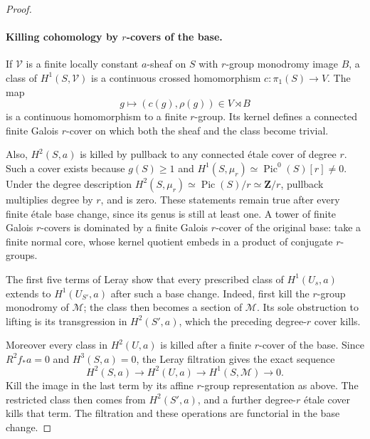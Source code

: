 \begin{proof}
\paragraph{Killing cohomology by $r$-covers of the base.}
If $\mathcal V$ is a finite locally constant $a$-sheaf on $S$ with
$r$-group monodromy image $B$, a class of $H^1(S,\mathcal V)$ is a
continuous crossed homomorphism $c:\pi_1(S)\to V$. The map
\[
 g\longmapsto(c(g),\rho(g))\in V\rtimes B
\]
is a continuous homomorphism to a finite $r$-group. Its kernel defines
a connected finite Galois $r$-cover on which both the sheaf and the
class become trivial.

Also, $H^2(S,a)$ is killed by pullback to any connected \'etale cover
of degree $r$. Such a cover exists because $g(S)\geq1$ and
$H^1(S,\mu_r)\simeq\operatorname{Pic}^0(S)[r]\ne0$.
Under the degree description
$H^2(S,\mu_r)\simeq\operatorname{Pic}(S)/r\simeq\mathbf Z/r$,
pullback multiplies degree by $r$, and is zero. These statements remain
true after every finite \'etale base change, since its genus is still
at least one. A tower of finite Galois $r$-covers is dominated by a
finite Galois $r$-cover of the original base: take a finite normal core,
whose kernel quotient embeds in a product of conjugate $r$-groups.

The first five terms of Leray show that every prescribed class of
$H^1(U_s,a)$ extends to $H^1(U_{S'},a)$ after such a base change.
Indeed, first kill the $r$-group monodromy of $\mathcal M$; the class
then becomes a section of $\mathcal M$. Its sole obstruction to lifting
is its transgression in $H^2(S',a)$, which the preceding degree-$r$
cover kills.

Moreover every class in $H^2(U,a)$ is killed after a finite $r$-cover
of the base. Since $R^2f_*a=0$ and $H^3(S,a)=0$, the Leray filtration
gives the exact sequence
\[
 H^2(S,a)\longrightarrow H^2(U,a)
 \longrightarrow H^1(S,\mathcal M)\longrightarrow0.              \tag{DC.2}
\]
Kill the image in the last term by its affine $r$-group representation
as above. The restricted class then comes from $H^2(S',a)$, and a
further degree-$r$ \'etale cover kills that term. The filtration and
these operations are functorial in the base change.


\end{proof}
